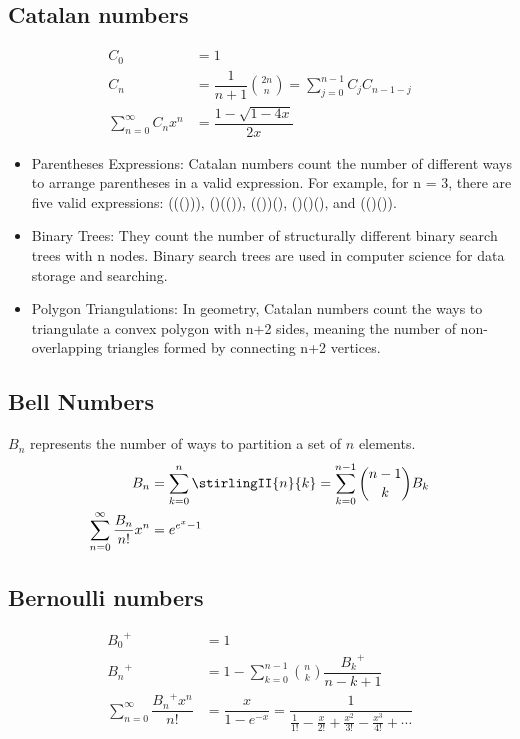 \subsection{Catalan numbers}
    \begin{align*}
        C_0 &= 1 \\
        C_n &= \dfrac{1}{n+1}\binom{2n}{n} = \sum_{j=0}^{n-1} C_j C_{n-1-j} \\
        \sum_{n=0}^{\infty} C_n x^n &= \dfrac{1-\sqrt{1-4x}}{2x}
    \end{align*}
\begin{itemize}
    \item Parentheses Expressions: Catalan numbers count the number of different ways to arrange parentheses in a valid expression. For example, for n = 3, there are five valid expressions: ((())), ()(()), (())(), ()()(), and (()()).

    \item Binary Trees: They count the number of structurally different binary search trees with n nodes. Binary search trees are used in computer science for data storage and searching.

    \item Polygon Triangulations: In geometry, Catalan numbers count the ways to triangulate a convex polygon with n+2 sides, meaning the number of non-overlapping triangles formed by connecting n+2 vertices.


\end{itemize}

\subsection{Bell Numbers}
    $B_n$ represents the number of ways to partition a set of $n$ elements.
    \begin{align*}
        B_n &= \sum_{k=0}^{n}\stirlingII{n}{k} = \sum_{k=0}^{n-1}\binom{n-1}{k} B_k \\
        \sum_{n=0}^{\infty} \dfrac{B_n}{n!}x^n &= e^{e^x-1}
    \end{align*}

\subsection{Bernoulli numbers}
    \begin{align*}
        {B_0}^+ &= 1 \\
        {B_n}^+ &= 1 - \sum_{k=0}^{n-1}\binom{n}{k}\dfrac{{B_k}^+}{n-k+1} \\
        \sum_{n=0}^{\infty} \dfrac{{B_n}^+ x^n}{n!} &= \dfrac{x}{1-e^{-x}} = \dfrac{1}{\frac{1}{1!}-\frac{x}{2!}+\frac{x^2}{3!}-\frac{x^3}{4!}+\cdots}
    \end{align*}


